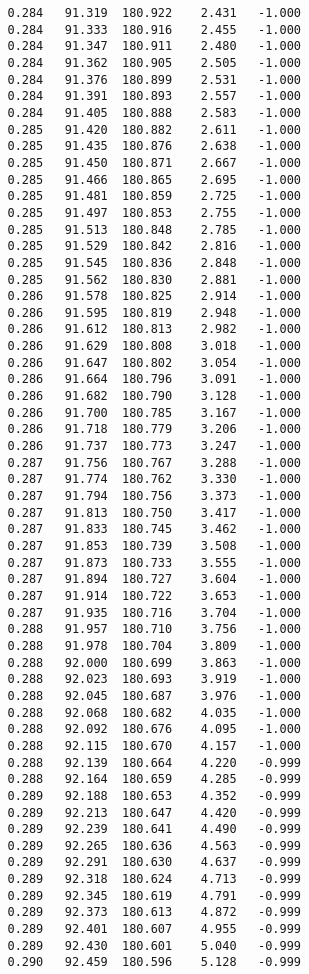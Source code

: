 \begin{verbatim}
   0.284   91.319  180.922    2.431   -1.000
   0.284   91.333  180.916    2.455   -1.000
   0.284   91.347  180.911    2.480   -1.000
   0.284   91.362  180.905    2.505   -1.000
   0.284   91.376  180.899    2.531   -1.000
   0.284   91.391  180.893    2.557   -1.000
   0.284   91.405  180.888    2.583   -1.000
   0.285   91.420  180.882    2.611   -1.000
   0.285   91.435  180.876    2.638   -1.000
   0.285   91.450  180.871    2.667   -1.000
   0.285   91.466  180.865    2.695   -1.000
   0.285   91.481  180.859    2.725   -1.000
   0.285   91.497  180.853    2.755   -1.000
   0.285   91.513  180.848    2.785   -1.000
   0.285   91.529  180.842    2.816   -1.000
   0.285   91.545  180.836    2.848   -1.000
   0.285   91.562  180.830    2.881   -1.000
   0.286   91.578  180.825    2.914   -1.000
   0.286   91.595  180.819    2.948   -1.000
   0.286   91.612  180.813    2.982   -1.000
   0.286   91.629  180.808    3.018   -1.000
   0.286   91.647  180.802    3.054   -1.000
   0.286   91.664  180.796    3.091   -1.000
   0.286   91.682  180.790    3.128   -1.000
   0.286   91.700  180.785    3.167   -1.000
   0.286   91.718  180.779    3.206   -1.000
   0.286   91.737  180.773    3.247   -1.000
   0.287   91.756  180.767    3.288   -1.000
   0.287   91.774  180.762    3.330   -1.000
   0.287   91.794  180.756    3.373   -1.000
   0.287   91.813  180.750    3.417   -1.000
   0.287   91.833  180.745    3.462   -1.000
   0.287   91.853  180.739    3.508   -1.000
   0.287   91.873  180.733    3.555   -1.000
   0.287   91.894  180.727    3.604   -1.000
   0.287   91.914  180.722    3.653   -1.000
   0.287   91.935  180.716    3.704   -1.000
   0.288   91.957  180.710    3.756   -1.000
   0.288   91.978  180.704    3.809   -1.000
   0.288   92.000  180.699    3.863   -1.000
   0.288   92.023  180.693    3.919   -1.000
   0.288   92.045  180.687    3.976   -1.000
   0.288   92.068  180.682    4.035   -1.000
   0.288   92.092  180.676    4.095   -1.000
   0.288   92.115  180.670    4.157   -1.000
   0.288   92.139  180.664    4.220   -0.999
   0.288   92.164  180.659    4.285   -0.999
   0.289   92.188  180.653    4.352   -0.999
   0.289   92.213  180.647    4.420   -0.999
   0.289   92.239  180.641    4.490   -0.999
   0.289   92.265  180.636    4.563   -0.999
   0.289   92.291  180.630    4.637   -0.999
   0.289   92.318  180.624    4.713   -0.999
   0.289   92.345  180.619    4.791   -0.999
   0.289   92.373  180.613    4.872   -0.999
   0.289   92.401  180.607    4.955   -0.999
   0.289   92.430  180.601    5.040   -0.999
   0.290   92.459  180.596    5.128   -0.999

\end{verbatim}
